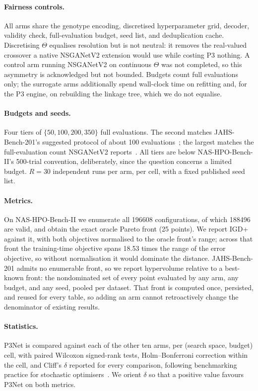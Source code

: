 \paragraph{Fairness controls.} All arms share the genotype encoding, discretised hyperparameter grid, decoder,
validity check, full-evaluation budget, seed list, and deduplication cache. Discretising $\Theta$ equalises
resolution but is not neutral: it removes the real-valued crossover a native NSGANetV2 extension would use while
costing P3 nothing. A control arm running NSGANetV2 on continuous $\Theta$ was not completed, so this asymmetry is
acknowledged but not bounded. Budgets count full evaluations only; the surrogate arms additionally spend
wall-clock time on refitting and, for the P3 engine, on rebuilding the linkage tree, which we do not equalise.

\paragraph{Budgets and seeds.} Four tiers of $\{50, 100, 200, 350\}$ full evaluations. The second matches
JAHS-Bench-201's suggested protocol of about 100 evaluations~\citep{bansal2022jahsbench}; the largest matches the
full-evaluation count NSGANetV2 reports~\citep{lu2020nsganetv2}. All tiers are below NAS-HPO-Bench-II's
500-trial convention, deliberately, since the question concerns a limited budget. $R=30$ independent runs per
arm, per cell, with a fixed published seed list.

\paragraph{Metrics.} On NAS-HPO-Bench-II we enumerate all 196608 configurations, of which 188496 are valid,
and obtain the exact oracle Pareto front (25 points). We report IGD+ against it, with both objectives normalised
to the oracle front's range; across that front the training-time objective spans 18.53 times the range of the
error objective, so without normalisation it would dominate the distance. JAHS-Bench-201 admits no enumerable front, so we report hypervolume relative to a
best-known front: the nondominated set of every point evaluated by any arm, any budget, and any seed, pooled per
dataset. That front is computed once, persisted, and reused for every table, so adding an arm cannot retroactively
change the denominator of existing results.

\paragraph{Statistics.} P3Net is compared against each of the other ten arms, per (search space, budget) cell,
with paired Wilcoxon signed-rank tests, Holm--Bonferroni correction within the cell, and Cliff's $\delta$
reported for every comparison, following benchmarking practice for stochastic
optimisers~\citep{BartzBeielstein2020Benchmarking,Hansen2016b}. We orient $\delta$ so that a positive value
favours P3Net on both metrics.

